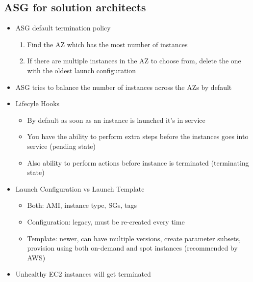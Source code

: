 \documentclass[]{scrartcl}
\begin{document}
\subsection{ASG for solution architects}
\begin{itemize}
	\item ASG default termination policy
	\begin{enumerate}
		\item Find the AZ which has the most number of instances
		\item If there are multiple instances in the AZ to choose from, delete the one with the oldest launch configuration
	\end{enumerate}
	\item ASG tries to balance the number of instances across the AZs by default
	\item Lifecyle Hooks
	\begin{itemize}
		\item By default as soon as an instance is launched it's in service
		\item You have the ability to perform extra steps before the instances goes into service (pending state)
		\item Also ability to perform actions before instance is terminated (terminating state)
	\end{itemize}
	\item Launch Configuration vs Launch Template
	\begin{itemize}
		\item Both: AMI, instance type, SGs, tags
		\item Configuration: legacy, must be re-created every time
		\item Template: newer, can have multiple versions, create parameter subsets, provision using both on-demand and spot instances (recommended by AWS)
	\end{itemize}
	\item Unhealthy EC2 instances will get terminated
\end{itemize}
\end{document}
